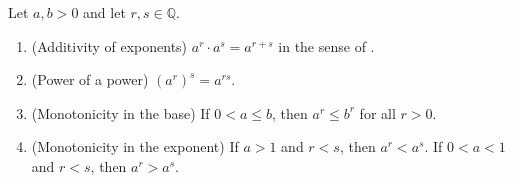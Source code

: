 \begin{theorem} \label{theorem:properties_of_rational_exponentiation}
    Let $a,b > 0$ and let $r,s \in \mathbb{Q}$.

    \begin{enumerate}
        \item (Additivity of exponents) $a^r \cdot a^s = a^{r+s}$ in the sense of .
        \item (Power of a power) $\left(a^r\right)^s = a^{rs}$.
        \item (Monotonicity in the base) If $0 < a \leq b$, then $a^r \leq b^r$ for all $r > 0$.
        \item (Monotonicity in the exponent) If $a > 1$ and $r < s$, then $a^r < a^s$. If $0 < a < 1$ and $r < s$, then $a^r > a^s$.
    \end{enumerate}
\end{theorem}

